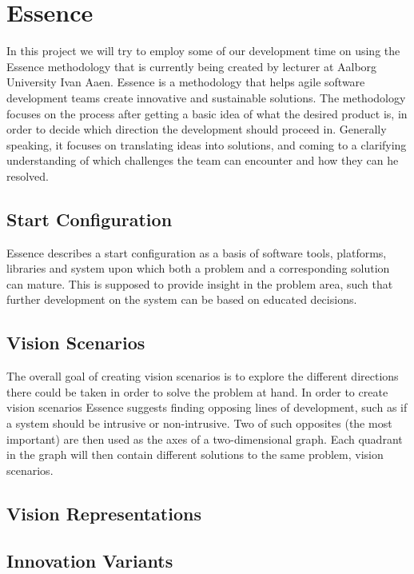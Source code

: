 
\section{Essence}
\label{sec:essence}

In this project we will try to employ some of our development time on using the Essence methodology that is currently being created by lecturer at Aalborg University Ivan Aaen. Essence is a methodology that helps agile software development teams create innovative and sustainable solutions. The methodology focuses on the process after getting a basic idea of what the desired product is, in order to decide which direction the development should proceed in. Generally speaking, it focuses on translating ideas into solutions, and coming to a clarifying understanding of which challenges the team can encounter and how they can he resolved.  

\subsection{Start Configuration}
\label{sub:essence_start_configuration}

Essence describes a start configuration as a basis of software tools, platforms, libraries and system upon which both a problem and a corresponding solution can mature. This is supposed to provide insight in the problem area, such that further development on the system can be based on educated decisions. 

\subsection{Vision Scenarios}
\label{sub:essence_vision_scenarios}
The overall goal of creating vision scenarios is to explore the different directions there could be taken in order to solve the problem at hand. In order to create vision scenarios Essence suggests finding opposing lines of development, such as if a system should be intrusive or non-intrusive. Two of such opposites (the most important) are then used as the axes of a two-dimensional graph. Each quadrant in the graph will then contain different solutions to the same problem, vision scenarios.

\subsection{Vision Representations}
\label{sub:vision_representations}

\subsection{Innovation Variants}
\label{sub:essence_innovation_variants}

 

